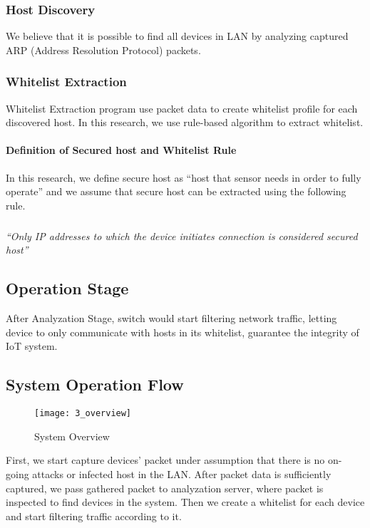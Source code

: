 \subsubsection{Host Discovery}
We believe that it is possible to find all devices in LAN by analyzing captured ARP (Address Resolution Protocol) packets.

\subsubsection{Whitelist Extraction}
Whitelist Extraction program use packet data to create whitelist profile for each discovered host. In this research, we use rule-based algorithm to extract whitelist.

\paragraph{Definition of Secured host and Whitelist Rule}
In this research, we define secure host as “host that sensor needs in order to fully operate” and we assume that secure host can be extracted using the following rule.  

\subparagraph{}
\begin{centering}
    \textit{“Only IP addresses to which the device initiates connection is considered secured host”} \\
\end{centering} 

\subsection{Operation Stage}
After Analyzation Stage, switch would start filtering network traffic, letting device to only communicate with hosts in its whitelist, guarantee the integrity of IoT system. 

\subsection{System Operation Flow}
\begin{figure}[h]
    \centering 
    \texttt{[image: 3\_overview]}
    \caption{System Overview}
    \label{fig:s3_system_overview}
\end{figure}

First, we start capture devices’ packet under assumption that there is no on-going attacks or infected host in the LAN. After packet data is sufficiently captured, we pass gathered packet to analyzation server, where packet is inspected to find devices in the system. Then we create a whitelist for each device and start filtering traffic according to it. 